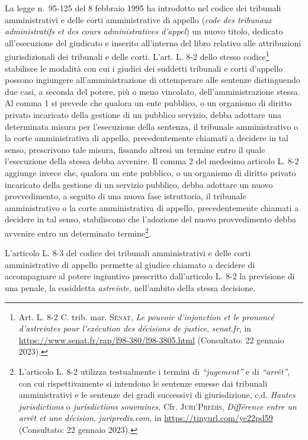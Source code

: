 \documentclass[12pt,it,a4paper,]{report}
\begin{document}
La legge n.~95-125 del 8 febbraio 1995 ha introdotto nel codice dei
tribunali amministrativi e delle corti amministrative di appello
(\emph{code des tribunaux administratifs et des cours administratives
d'appel}) un nuovo titolo, dedicato all'esecuzione del giudicato e
inserito all'interno del libro relativo alle attribuzioni
giurisdizionali dei tribunali e delle corti. L'art. L. 8-2 dello stesso
codice\footnote{Art. L. 8-2 C. trib. mar. \textsc{Sénat}, \emph{Le
  pouvoir d'injonction et le prononcé d'astreintes pour l'exécution des
  décisions de justice}, \emph{senat.fr}, in
  \url{https://www.senat.fr/rap/l98-380/l98-3805.html} (Consultato: 22
  gennaio 2023).} stabilisce le modalità con cui i giudici dei suddetti
tribunali e corti d'appello possono ingiungere all'amministrazione di
ottemperare alle sentenze distinguendo due casi, a seconda del potere,
più o meno vincolato, dell'amministrazione stessa. Al comma 1 si prevede
che qualora un ente pubblico, o un organismo di diritto privato
incaricato della gestione di un pubblico servizio, debba adottare una
determinata misura per l'esecuzione della sentenza, il tribunale
amministrativo o la corte amministrativa di appello, precedentemente
chiamati a decidere in tal senso, prescrivono tale misura, fissando
altresì un termine entro il quale l'esecuzione della stessa debba
avvenire. Il comma 2 del medesimo articolo L. 8-2 aggiunge invece che,
qualora un ente pubblico, o un organismo di diritto privato incaricato
della gestione di un servizio pubblico, debba adottare un nuovo
provvedimento, a seguito di una nuova fase istruttoria, il tribunale
amministrativo o la corte amministrativa di appello, precedentemente
chiamati a decidere in tal senso, stabiliscono che l'adozione del nuovo
provvedimento debba avvenire entro un determinato termine\footnote{L'articolo
  L. 8-2 utilizza testualmente i termini di \emph{``jugement''} e di
  \emph{``arrêt''}, con cui rispettivamente si intendono le sentenze
  emesse dai tribunali amministrativi e le sentenze dei gradi successivi
  di giurisdizione, c.d. \emph{Hautes jurisdictions} o
  \emph{jurisdictions souvraines}, Cfr. \textsc{Juri'Predis},
  \emph{Différence entre un arrêt et une décision},
  \emph{juripredis.com}, in \url{https://tinyurl.com/ye22pd59}
  (Consultato: 22 gennaio 2023).}.

L'articolo L. 8-3 del codice dei tribunali amministrativi e delle corti
amministrative di appello permette al giudice chiamato a decidere di
accompagnare al potere ingiuntivo prescritto dall'articolo L. 8-2 la
previsione di una penale, la cosiddetta \emph{astreinte}, nell'ambito
della stessa decisione.
\end{document}
